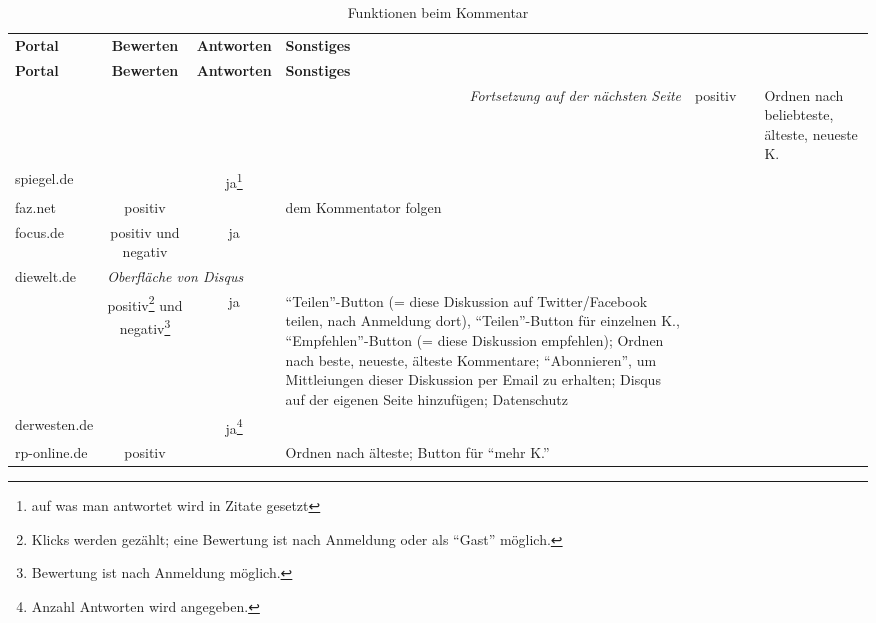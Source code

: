 \begin{landscape} \footnotesize
\begin{longtable}{lccp{100mm}}

  \caption{Funktionen beim Kommentar} \\ \\
  \toprule
  \bfseries Portal & \bfseries Bewerten & \bfseries Antworten & \bfseries Sonstiges \\
  \midrule[\heavyrulewidth]
  \endfirsthead

  \toprule
  \bfseries Portal & \bfseries Bewerten & \bfseries Antworten & \bfseries Sonstiges \\
  \midrule[\heavyrulewidth]
  \endhead

  \multicolumn{4}{r}{\emph{Fortsetzung auf der nächsten Seite}}
  \endfoot

  \bottomrule
  \endlastfoot

bild.de
& positiv
&
& Ordnen nach beliebteste, älteste, neueste K.
\\\midrule

spiegel.de
&
& ja\footnote{auf was man antwortet wird in Zitate gesetzt}
&
\\\midrule

faz.net
& positiv
&
& dem Kommentator folgen
\\\midrule

focus.de
& positiv und negativ
& ja
&
\\\midrule

diewelt.de & \multicolumn{3}{l}{\hspace{2cm}\em Oberfläche von Disqus}
\\\cmidrule(lr){2-4}

& positiv\footnote{Klicks werden gezählt; eine Bewertung ist nach Anmeldung oder
  als ``Gast'' möglich.} und negativ\footnote{Bewertung ist nach Anmeldung
  möglich.}
& ja
& ``Teilen''-Button (= diese Diskussion auf Twitter/Facebook teilen, nach
  Anmeldung dort), ``Teilen''-Button für einzelnen K., ``Empfehlen''-Button (=
  diese Diskussion empfehlen); Ordnen nach beste, neueste, älteste Kommentare;
  ``Abonnieren'', um Mittleiungen dieser Diskussion per Email zu erhalten;
  Disqus auf der eigenen Seite hinzufügen; Datenschutz
\\\midrule

derwesten.de
&
& ja\footnote{Anzahl Antworten wird angegeben.}
&
\\\midrule

rp-online.de
& positiv
&
& Ordnen nach älteste; Button für ``mehr K.''
\\\midrule


\end{longtable}
\end{landscape}
